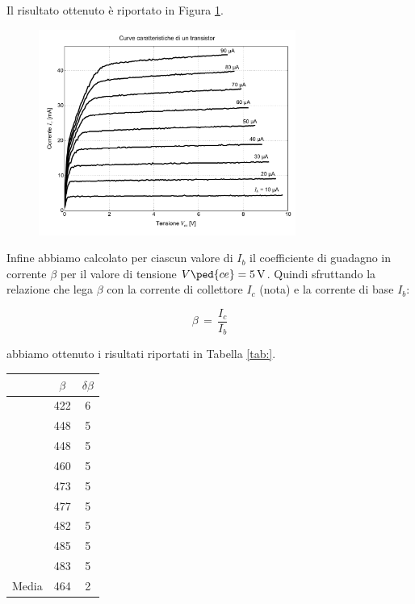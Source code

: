 Il risultato ottenuto è riportato in Figura \ref{fig:cara}.

\begin{figure}
	\centering
	\includegraphics[width=0.75\textwidth]{transistor.pdf}
	\caption{}
	\label{fig:cara}
\end{figure}

Infine abbiamo calcolato per ciascun valore di $I_b$ il coefficiente di guadagno in corrente $\beta$ per il valore di tensione $V\ped{ce}=\SI{5}{\volt}$. Quindi sfruttando la relazione che lega $\beta$ con la corrente di collettore $I_c$ (nota) e la corrente di base $I_b$:

\begin{equation}
	\beta \,=\, \frac{I_c}{I_b}
\end{equation}

abbiamo ottenuto i risultati riportati in Tabella \ref{tab:}.

\begin{table}
    \centering
    \begin{tabular}{l c c}
        \toprule
        &$\beta$ & $\delta\beta$ \\
        \midrule
        & 422 & 6 \\
        & 448 & 5 \\
        & 448 & 5 \\
        & 460 & 5 \\
        & 473 & 5 \\
        & 477 & 5 \\
        & 482 & 5 \\
        & 485 & 5 \\
        & 483 & 5 \\
        \midrule
        Media & 464 & 2 \\
        \bottomrule
    \end{tabular}
\end{table}